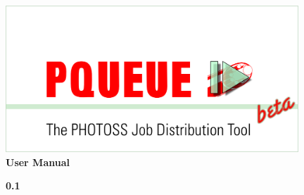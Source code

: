 
\usepackage{tikz}
\usetikzlibrary{snakes}
\usepackage{PScript}
\usepackage{PQueueScript}

\newcommand{\photoss}{\PHO{}}
\newcommand{\pjob}{\PJOB{}}
\newcommand{\matlab}{\Matt{}}
\newcommand{\pho}{.pho}
\newcommand{\pscript}{.pscript}
\newcommand{\pjobeditor}{\mbox{PJobEditor}}
\newcommand{\mac}{\mbox{MacOSX\textsuperscript{\textregistered}}}

\makeindex



	\begin{titlepage}

	\vspace*{2cm}

	\begin{center}
		\includegraphics[width=11.00cm]{../../src/PQueue/Resources/splash_gross.png}\\
		\vspace*{3cm}
	 \Huge{  \textcolor{phocolor}{\textbf{User Manual}}}\\
	\end{center}

	\vspace{1cm} 
	\begin{center}
	\textcolor{phocolor}{\textbf{\Huge \PQUEUE{} 0.1}}
	\end{center}

	\end{titlepage}

\newpage 
\pagestyle{empty}

